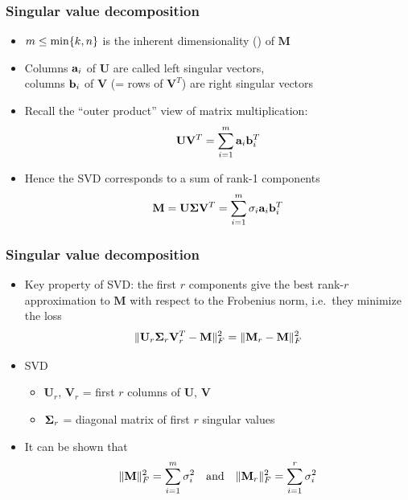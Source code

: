 \documentclass[t]{beamer} %
\begin{document}
\begin{frame}
  \frametitle{Singular value decomposition}

  \begin{itemize}
  \item $m \leq \min \set{k, n}$ is the inherent dimensionality () of $\mathbf{M}$
  \item Columns $\va_i$ of $\mathbf{U}$ are called left singular vectors,\\
    columns $\vb_i$ of $\mathbf{V}$ (= rows of $\mathbf{V}^T$) are right singular vectors
  \item Recall the ``outer product'' view of matrix multiplication:
    \[
      \mathbf{U} \mathbf{V}^T = \sum_{i=1}^m \va_i \vb_i^T
    \]
  \item Hence the SVD corresponds to a sum of rank-1 components
    \[
      \mathbf{M} = \mathbf{U} \Msigma \mathbf{V}^T = \sum_{i=1}^m \sigma_i \va_i \vb_i^T
    \]
  \end{itemize}
\end{frame}

\begin{frame}
  \frametitle{Singular value decomposition}

  \begin{itemize}
  \item Key property of SVD: the first $r$ components give the best rank-$r$
    approximation to $\mathbf{M}$ with respect to the Frobenius norm, i.e.\ they minimize the loss
    \[
      \norm[F]{ \mathbf{U}_r \Msigma_r \mathbf{V}_r^T - \mathbf{M} }^2
      = \norm[F]{ \mathbf{M}_r - \mathbf{M} }^2
    \]
  \item[\hand]  SVD
    \begin{itemize}
    \item $\mathbf{U}_r$, $\mathbf{V}_r$ = first $r$ columns of $\mathbf{U}$, $\mathbf{V}$
    \item $\Msigma_r$ = diagonal matrix of first $r$ singular values
    \end{itemize}
  \item<2-> It can be shown that
    \[
      \norm[F]{ \mathbf{M} }^2 = \sum_{i=1}^m \sigma_i^2 \quad \text{and} \quad
      \norm[F]{ \mathbf{M}_r }^2 = \sum_{i=1}^r \sigma_i^2      
    \]
  \end{itemize}
\end{frame}
\end{document}
